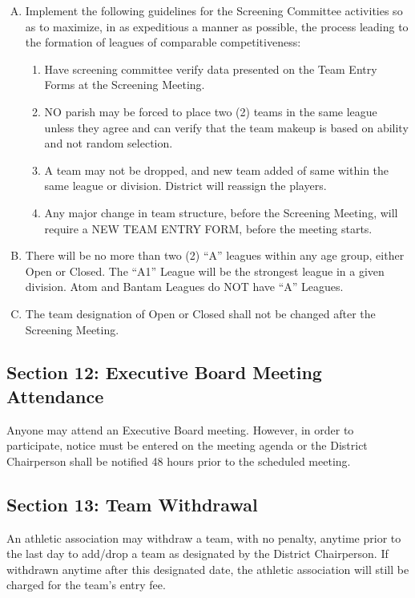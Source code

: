 \documentclass[letteraper,10pt,oneside,draft]{memoir}
\begin{document}
\begin{enumerate}[A.]
    \item Implement the following guidelines for the Screening Committee activities so as to maximize, in as expeditious a manner as possible, the process leading to the formation of leagues of comparable competitiveness:
    \begin{enumerate}[1.]
        \item Have screening committee verify data presented on the Team Entry Forms at the Screening Meeting.
        \item NO parish may be forced to place two (2) teams in the same league unless they agree and can verify that the team makeup is based on ability and not random selection.
        \item A team may not be dropped, and new team added of same within the same league or division. District will reassign the players.
        \item Any major change in team structure, before the Screening Meeting, will require a NEW TEAM ENTRY FORM, before the meeting starts.
    \end{enumerate}
    \item There will be no more than two (2) ``A'' leagues within any age group, either Open or Closed.  The ``A1'' League will be the strongest league in a given division.  Atom and Bantam Leagues do NOT have “A” Leagues.
    \item The team designation of Open or Closed shall not be changed after the Screening Meeting.
\end{enumerate}

\subsection{Section 12: Executive Board Meeting Attendance}
Anyone may attend an Executive Board meeting.  However, in order to participate, notice must be entered on the meeting agenda or the District Chairperson shall be notified 48 hours prior to the scheduled meeting.

\subsection{Section 13: Team Withdrawal}
An athletic association may withdraw a team, with no penalty, anytime prior to the last day to add/drop a team as designated by the District Chairperson.  If withdrawn anytime after this designated date, the athletic association will still be charged for the team's entry fee.


    
    
    

\backmatter
\end{document}
